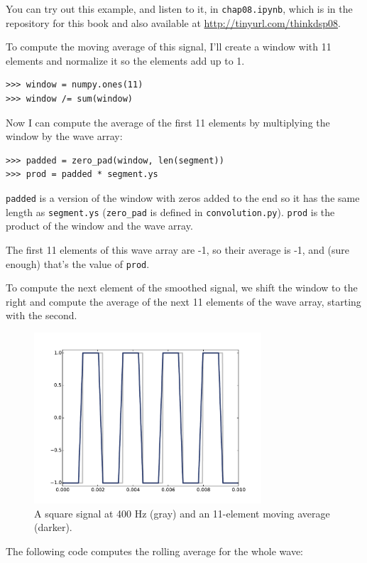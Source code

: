 \documentclass[12pt]{book}
\begin{document}
You can try out this example, and listen to it, in
{\tt chap08.ipynb}, which is in the repository for this
book and also available at \url{http://tinyurl.com/thinkdsp08}.

To compute the moving average of this signal, I'll create
a window with 11 elements and normalize it so the elements
add up to 1.

\begin{verbatim}
>>> window = numpy.ones(11)
>>> window /= sum(window)
\end{verbatim}

Now I can compute the average of the first 11 elements by
multiplying the window by the wave array:

\begin{verbatim}
>>> padded = zero_pad(window, len(segment))
>>> prod = padded * segment.ys
\end{verbatim}

{\tt padded} is a version of the window with zeros added to
the end so it has the same length as {\tt segment.ys}
(\verb"zero_pad" is defined in {\tt convolution.py}).
{\tt prod} is the product of the window and the wave array.

The first 11 elements of this wave array are -1, so their
average is -1, and (sure enough) that's the value of {\tt prod}.

To compute the next element of the smoothed signal, we shift the
window to the right and compute the average of the next
11 elements of the wave
array, starting with the second.

\begin{figure}
\centerline{\includegraphics[height=2.5in]{figs/convolution2.pdf}}
\caption{A square signal at 400 Hz (gray) and an 11-element
moving average (darker).}
\label{fig.convolution2}
\end{figure}


The following code computes the rolling average for the whole
wave:
\end{document}
